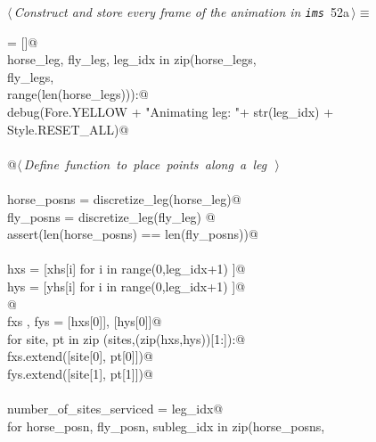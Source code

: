 \documentclass[11.5pt]{report}
\begin{document}
\begin{flushleft} \small
\begin{minipage}{\linewidth}\label{scrap66}\raggedright\small
{} $\langle\,${\itshape Construct and store every frame of the animation in \verb|ims|}\nobreak\ {\footnotesize {52a}}$\,\rangle\equiv$
\vspace{-1ex}
\begin{list}{}{} \item
\mbox{}\verb@ims = []@\\
\mbox{}\verb@for horse_leg, fly_leg, leg_idx in zip(horse_legs, \@\\
\mbox{}\verb@                                       fly_legs,   \@\\
\mbox{}\verb@                                       range(len(horse_legs))):@\\
\mbox{}\verb@     debug(Fore.YELLOW + "Animating leg: "+ str(leg_idx) + Style.RESET_ALL)@\\
\mbox{}\verb@@\\
\mbox{}\verb@     @\hbox{$\langle\,${\itshape Define function to place points along a leg}\nobreak\ {\footnotesize {}}$\,\rangle$}\verb@@\\
\mbox{}\verb@@\\
\mbox{}\verb@     horse_posns = discretize_leg(horse_leg)@\\
\mbox{}\verb@     fly_posns   = discretize_leg(fly_leg) @\\
\mbox{}\verb@     assert(len(horse_posns) == len(fly_posns))@\\
\mbox{}\verb@@\\
\mbox{}\verb@     hxs = [xhs[i] for i in range(0,leg_idx+1) ]@\\
\mbox{}\verb@     hys = [yhs[i] for i in range(0,leg_idx+1) ]@\\
\mbox{}\verb@           @\\
\mbox{}\verb@     fxs , fys = [hxs[0]], [hys[0]]@\\
\mbox{}\verb@     for site, pt in zip (sites,(zip(hxs,hys))[1:]):@\\
\mbox{}\verb@          fxs.extend([site[0], pt[0]])@\\
\mbox{}\verb@          fys.extend([site[1], pt[1]])@\\
\mbox{}\verb@@\\
\mbox{}\verb@     number_of_sites_serviced = leg_idx@\\
\mbox{}\verb@     for horse_posn, fly_posn, subleg_idx in zip(horse_posns, \@\\

\end{list}
\end{minipage}
\end{flushleft}
\end{document}
